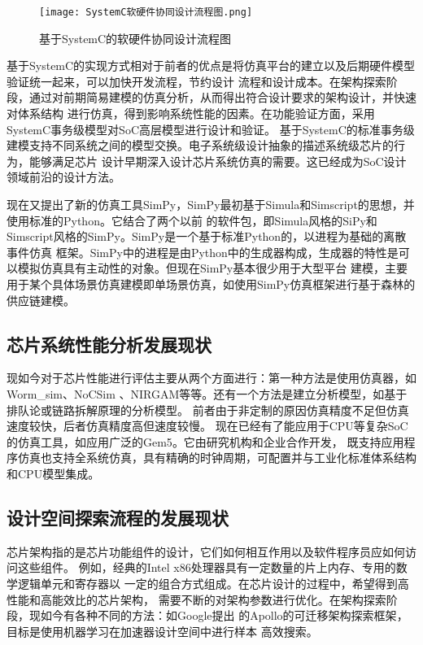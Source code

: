 \begin{figure}
    \centering
    \texttt{[image: SystemC软硬件协同设计流程图.png]}
    \caption{基于SystemC的软硬件协同设计流程图}
    \label{fig:badge}
\end{figure}

基于SystemC的实现方式相对于前者的优点是将仿真平台的建立以及后期硬件模型验证统一起来，可以加快开发流程，节约设计
流程和设计成本。在架构探索阶段，通过对前期简易建模的仿真分析，从而得出符合设计要求的架构设计，并快速对体系结构
进行仿真，得到影响系统性能的因素。在功能验证方面，采用SystemC事务级模型对SoC高层模型进行设计和验证\cite{8}。
基于SystemC的标准事务级建模支持不同系统之间的模型交换。电子系统级设计抽象的描述系统级芯片的行为，能够满足芯片
设计早期深入设计芯片系统仿真的需要\cite{9}。这已经成为SoC设计领域前沿的设计方法。

现在又提出了新的仿真工具SimPy，SimPy最初基于Simula和Simscript的思想，并使用标准的Python。它结合了两个以前
的软件包，即Simula风格的SiPy和Simscript风格的SimPy。SimPy是一个基于标准Python的，以进程为基础的离散事件仿真
框架。SimPy中的进程是由Python中的生成器构成，生成器的特性是可以模拟仿真具有主动性的对象。但现在SimPy基本很少用于大型平台
建模，主要用于某个具体场景仿真建模即单场景仿真\cite{10}，如使用SimPy仿真框架进行基于森林的供应链建模\cite{11}。

\subsection{芯片系统性能分析发展现状}
现如今对于芯片性能进行评估主要从两个方面进行：第一种方法是使用仿真器，如Worm\_sim、NoCSim
、NIRGAM等等。还有一个方法是建立分析模型，如基于排队论或链路拆解原理的分析模型\cite{39}。
前者由于非定制的原因仿真精度不足但仿真速度较快，后者仿真精度高但速度较慢。
现在已经有了能应用于CPU等复杂SoC的仿真工具，如应用广泛的Gem5\cite{12}。它由研究机构和企业合作开发，
既支持应用程序仿真也支持全系统仿真，具有精确的时钟周期，可配置并与工业化标准体系结构和CPU模型集成。

\subsection{设计空间探索流程的发展现状}
芯片架构指的是芯片功能组件的设计，它们如何相互作用以及软件程序员应如何访问这些组件。
例如，经典的Intel x86处理器具有一定数量的片上内存、专用的数学逻辑单元和寄存器以
一定的组合方式组成。在芯片设计的过程中，希望得到高性能和高能效比的芯片架构，
需要不断的对架构参数进行优化。在架构探索阶段，现如今有各种不同的方法：如Google提出
的Apollo的可迁移架构探索框架\cite{43}，目标是使用机器学习在加速器设计空间中进行样本
高效搜索。

